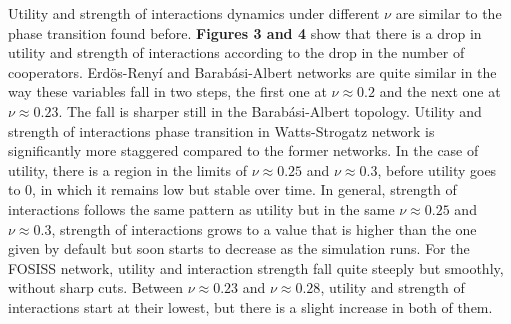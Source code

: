 \documentclass[11pt]{article}
\begin{document}
\FloatBarrier

Utility and strength of interactions dynamics under different $\nu$ are similar to the
phase transition found before. \textbf{Figures 3 and 4} show
that there is a drop in utility and strength of interactions according to the
drop in the number of cooperators. Erd\"{o}s-Reny\'i and Barab\'asi-Albert
networks are quite similar in the way these variables fall in two steps, the
first one at $\nu \approx 0.2$ and the next one at $\nu \approx 0.23$. The fall
is sharper still in the Barab\'asi-Albert topology. Utility and strength of
interactions phase transition in Watts-Strogatz network is significantly more
staggered compared to the former networks. In the case of utility, there is a
region in the limits of $\nu \approx 0.25$ and $\nu \approx 0.3$, before utility
goes to $0$, in which it remains low but stable over time. In general, strength
of interactions follows the same pattern as utility but in the same $\nu \approx
0.25$ and $\nu \approx 0.3$, strength of interactions grows to a value that is
higher than the one given by default but soon starts to decrease as the
simulation runs. For the FOSISS network, utility and interaction strength fall
quite steeply but smoothly, without sharp cuts. Between $\nu \approx 0.23$ and
$\nu \approx 0.28$, utility and strength of interactions start at their lowest,
but there is a slight increase in both of them.
\end{document}
